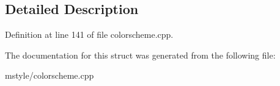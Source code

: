 \subsection{Detailed Description}


Definition at line 141 of file colorscheme.\+cpp.



The documentation for this struct was generated from the following file\+:\begin{DoxyCompactItemize}
\item 
mstyle/colorscheme.\+cpp\end{DoxyCompactItemize}
